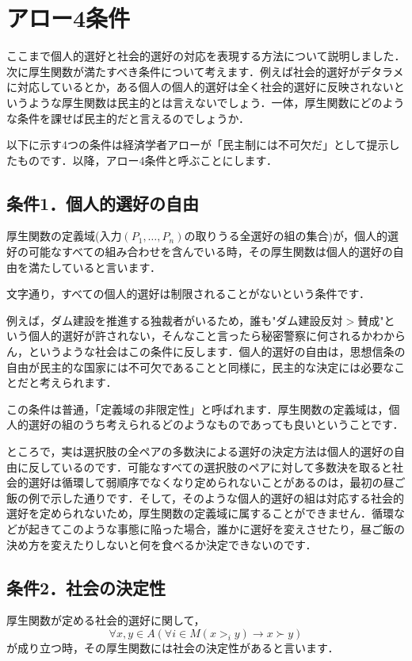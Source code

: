 \section{アロー4条件}
ここまで個人的選好と社会的選好の対応を表現する方法について説明しました．次に厚生関数が満たすべき条件について考えます．例えば社会的選好がデタラメに対応しているとか，ある個人の個人的選好は全く社会的選好に反映されないというような厚生関数は民主的とは言えないでしょう．一体，厚生関数にどのような条件を課せば民主的だと言えるのでしょうか．

以下に示す4つの条件は経済学者アローが「民主制には不可欠だ」として提示したものです．以降，アロー4条件と呼ぶことにします．

\subsection*{条件1．個人的選好の自由}
\begin{dfn}[個人的選好の自由]
    厚生関数の定義域(入力$(P_1, \dots, P_n)$の取りうる全選好の組の集合)が，個人的選好の可能なすべての組み合わせを含んでいる時，その厚生関数は個人的選好の自由を満たしていると言います．
\end{dfn}

文字通り，すべての個人的選好は制限されることがないという条件です．

例えば，ダム建設を推進する独裁者がいるため，誰も"$ダム建設反対 > 賛成$"という個人的選好が許されない，そんなこと言ったら秘密警察に何されるかわからん，というような社会はこの条件に反します．個人的選好の自由は，思想信条の自由が民主的な国家には不可欠であることと同様に，民主的な決定には必要なことだと考えられます．

この条件は普通，「定義域の非限定性」と呼ばれます．厚生関数の定義域は，個人的選好の組のうち考えられるどのようなものであっても良いということです．

ところで，実は選択肢の全ペアの多数決による選好の決定方法は個人的選好の自由に反しているのです．可能なすべての選択肢のペアに対して多数決を取ると社会的選好は循環して弱順序でなくなり定められないことがあるのは，最初の昼ご飯の例で示した通りです．そして，そのような個人的選好の組は対応する社会的選好を定められないため，厚生関数の定義域に属することができません．循環などが起きてこのような事態に陥った場合，誰かに選好を変えさせたり，昼ご飯の決め方を変えたりしないと何を食べるか決定できないのです．

\subsection*{条件2．社会の決定性}
\begin{dfn}[社会の決定性]
    厚生関数が定める社会的選好に関して，
    \begin{equation*}
        \forall x,y \in A (\forall i \in M (x >_i y) \to x \succ y)
    \end{equation*}
    が成り立つ時，その厚生関数には社会の決定性があると言います．
\end{dfn}

